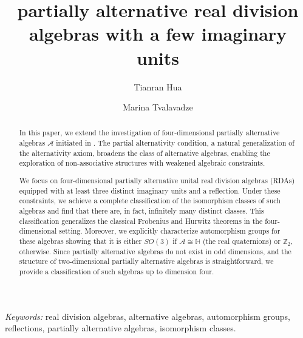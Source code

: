 \documentclass{amsart}
\theoremstyle{definition}
\theoremstyle{plain}
\begin{document}
\title[Partially Alternative Real Division  Algebras]
{partially alternative real division  algebras with a few imaginary units}


\author{Tianran  Hua}


\address{T. Hua, Department Of Mathematical and
Computational Sciences, University of Toronto Mississauga, 3359
Mississauga Road N., Mississauga, On L5L 1C6}


\author{Marina  Tvalavadze}

\address{M. Tvalavadze, Department Of Mathematical and
Computational Sciences, University of Toronto Mississauga, 3359
Mississauga Road N., Mississauga, On L5L 1C6}





\begin{abstract}
In this paper, we extend the investigation of four-dimensional partially alternative algebras $\mathcal A$ initiated in \cite{HNT}. The partial alternativity condition, a natural generalization of the alternativity axiom, broadens the class of alternative algebras, enabling the exploration of non-associative structures with weakened algebraic constraints.

We focus on four-dimensional partially alternative unital real division algebras (RDAs) equipped with at least three distinct imaginary units and a reflection. Under these constraints, we achieve a complete classification of the isomorphism classes of such algebras and find that there are, in fact, infinitely many distinct classes.
This classification generalizes  the classical Frobenius and Hurwitz theorems in the four-dimensional setting. Moreover,  we  explicitly characterize  automorphism groups for these algebras showing that it is either $SO(3)$ if $\mathcal A\cong \mathbb H$ (the real quaternions) or $\mathbb Z_2$, otherwise. Since partially alternative algebras do not exist in odd dimensions, and the structure of two-dimensional partially alternative algebras is straightforward, we provide a classification of such algebras up to dimension four.
\end{abstract}
\maketitle
\textit{ Keywords:} real division algebras, alternative algebras, automorphism groups, reflections, partially alternative algebras, isomorphism classes.
\end{document}
